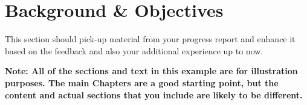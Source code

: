 \chapter{Background \& Objectives}

This section should pick-up material from your progress report and enhance it based on the feedback and also your additional experience up to now. 

\textbf{Note: All of the sections and text in this example are for illustration purposes. The main Chapters are a good starting point, but the content and actual sections that you include are likely to be different.}